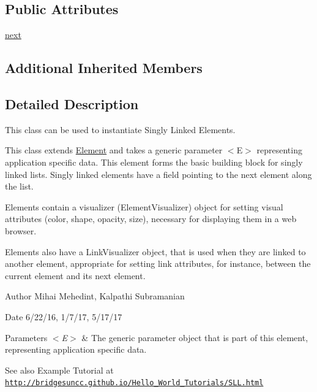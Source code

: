 \subsection*{Public Attributes}
\begin{DoxyCompactItemize}
\item 
\hyperlink{class_bridges_1_1_s_lelement_1_1_s_lelement_a650935f5a68b49de4c222cc4c8b0c778}{next}
\end{DoxyCompactItemize}
\subsection*{Additional Inherited Members}


\subsection{Detailed Description}
This class can be used to instantiate Singly Linked Elements. 

This class extends \hyperlink{namespace_bridges_1_1_element}{Element} and takes a generic parameter $<$\+E$>$ representing application specific data. This element forms the basic building block for singly linked lists. Singly linked elements have a field pointing to the next element along the list.

\begin{DoxyVerb}Elements contain a visualizer (ElementVisualizer) object for setting visual
attributes (color, shape, opacity, size), necessary for displaying them in a
web browser.

Elements also have a LinkVisualizer object, that is used when they are linked to
another element, appropriate for setting link attributes, for instance, between
the current element and its next element.
\end{DoxyVerb}


\begin{DoxyAuthor}{Author}
Mihai Mehedint, Kalpathi Subramanian
\end{DoxyAuthor}
\begin{DoxyDate}{Date}
6/22/16, 1/7/17, 5/17/17
\end{DoxyDate}

\begin{DoxyParams}{Parameters}
{\em $<$\+E$>$} & The generic parameter object that is part of this element, representing application specific data.\\
\hline
\end{DoxyParams}
\begin{DoxySeeAlso}{See also}
Example Tutorial at ~\newline
 \href{http://bridgesuncc.github.io/Hello_World_Tutorials/SLL.html}{\tt http\+://bridgesuncc.\+github.\+io/\+Hello\+\_\+\+World\+\_\+\+Tutorials/\+S\+L\+L.\+html} 
\end{DoxySeeAlso}


